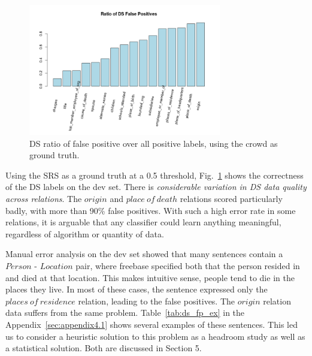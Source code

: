 \begin{figure}[htb!]
\centering
\includegraphics[width=0.75\textwidth]{img/fp_ratio.png}
\caption{DS ratio of false positive over all positive labels, using the crowd as ground truth.}
\label{fig:fp_rate}
\end{figure}

Using the SRS as a ground truth at a 0.5 threshold, Fig.~\ref{fig:fp_rate} shows the correctness of the DS labels on the dev set.  There is \textit{considerable variation in DS data quality across relations}. The $origin$ and $place\ of\ death$ relations scored particularly badly, with more than 90\% false positives. With such a high error rate in some relations, it is arguable that any classifier could learn anything meaningful, regardless of algorithm or quantity of data.

Manual error analysis on the dev set showed that many sentences contain a $Person$ - $Location$ pair, where freebase specified both that the person resided in and died at that location. This makes intuitive sense, people tend to die in the places they live.  In most of these cases, the sentence expressed only the $places\ of\ residence$ relation, leading to the false positives. The $origin$ relation data suffers from the same problem.  Table~\ref{tab:ds_fp_ex} in the Appendix~\ref{sec:appendix4.1} shows several examples of these sentences. This led us to consider a heuristic solution to this problem as a headroom study as well as a statistical solution. Both are discussed in Section 5.

